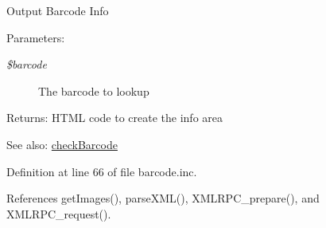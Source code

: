 Output Barcode Info \begin{Desc}
\item[Parameters:]
\begin{description}
\item[{\em \$barcode}]The barcode to lookup \end{description}
\end{Desc}
\begin{Desc}
\item[Returns:]HTML code to create the info area \end{Desc}
\begin{Desc}
\item[See also:]\hyperlink{barcode_8inc_b34ec866d27061573a5fa623bf314fc1}{checkBarcode} \end{Desc}


Definition at line 66 of file barcode.inc.

References getImages(), parseXML(), XMLRPC\_\-prepare(), and XMLRPC\_\-request().

